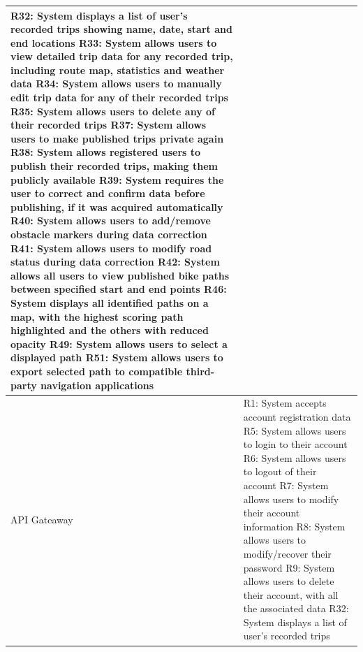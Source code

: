 \begin{longtable}{|p{3cm}|p{13cm}|}
   R32: System displays a list of user’s recorded trips showing name, date, start and end locations \newline
   R33: System allows users to view detailed trip data for any recorded trip, including route map, statistics and weather data \newline
   R34: System allows users to manually edit trip data for any of their recorded trips \newline
   R35: System allows users to delete any of their recorded trips \newline
   R37: System allows users to make published trips private again \newline
   R38: System allows registered users to publish their recorded trips, making them publicly available \newline
   R39: System requires the user to correct and confirm data before publishing, if it was acquired automatically \newline
   R40: System allows users to add/remove obstacle markers during data correction \newline
   R41: System allows users to modify road status during data correction \newline
   R42: System allows all users to view published bike paths between specified start and end points \newline
   R46: System displays all identified paths on a map, with the highest scoring path highlighted and the others with reduced opacity \newline
   R49: System allows users to select a displayed path \newline
   R51: System allows users to export selected path to compatible third-party navigation applications \\ \hline
   API Gateaway &
   R1: System accepts account registration data \newline
   R5: System allows users to login to their account \newline
   R6: System allows users to logout of their account \newline
   R7: System allows users to modify their account information \newline
   R8: System allows users to modify/recover their password \newline
   R9: System allows users to delete their account, with all the associated data \newline
   R32: System displays a list of user’s recorded trips \newline

\end{longtable}
